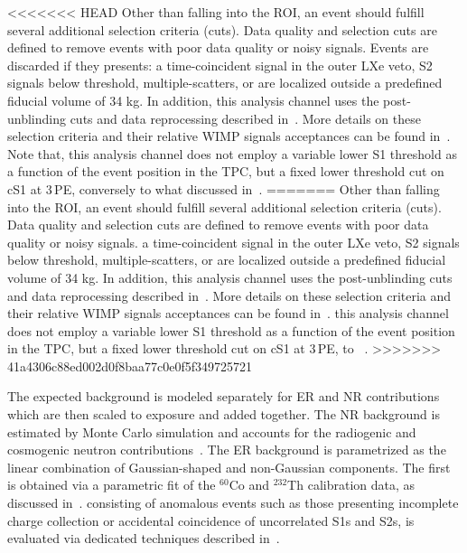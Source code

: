 <<<<<<< HEAD
Other than falling into the ROI, an event should fulfill several additional selection criteria (cuts). Data quality and selection cuts are defined to remove events with poor data quality or noisy signals.
Events are discarded if they presents: a time-coincident signal in the outer LXe veto, S2 signals below threshold, multiple-scatters, or are localized outside a predefined fiducial volume of 34 kg. In addition, this analysis channel uses the post-unblinding cuts and data reprocessing described in~\cite{xe100_run_combination}. More details on these selection criteria and their relative WIMP signals acceptances can be found in~\cite{Aprile:2012vw,xe100_run_combination}. Note that,
this analysis channel does not employ a variable lower S1 threshold as a function of the event position in the TPC, but a fixed 
lower threshold cut on cS1 at 3\,PE, conversely to what discussed in~\cite{xe100_run_combination}.
=======
Other than falling into the ROI, an event should fulfill several additional selection criteria (cuts). Data quality and selection cuts are defined to remove events with poor data quality or noisy signals.  a time-coincident signal in the outer LXe veto, S2 signals below threshold, multiple-scatters, or are localized outside a predefined fiducial volume of 34 kg. In addition, this analysis channel uses the post-unblinding cuts and data reprocessing described in~\cite{xe100_run_combination}. More details on these selection criteria and their relative WIMP signals acceptances can be found in~\cite{Aprile:2012vw,xe100_run_combination}. 
this analysis channel does not employ a variable lower S1 threshold as a function of the event position in the TPC, but  a fixed lower threshold cut on cS1 at 3\,PE,  to ~\cite{xe100_run_combination}.
>>>>>>> 41a4306c88ed002d0f8baa77c0e0f5f349725721

The expected background is modeled separately for ER and NR contributions which are then scaled to exposure and added together.
The NR background is estimated by Monte Carlo simulation and accounts for the radiogenic and cosmogenic neutron
contributions~\cite{Aprile:2013tov}. The ER background is parametrized as the linear combination of Gaussian-shaped and non-Gaussian components.
The first is obtained via a parametric fit of the $^{60}$Co and $^{232}$Th calibration data, as discussed in~\cite{xe100_run10_si}.
 consisting of anomalous events such as those 
presenting incomplete charge collection or accidental coincidence of uncorrelated S1s and S2s,  
is evaluated via dedicated techniques described in~\cite{xe100_run_combination}.

